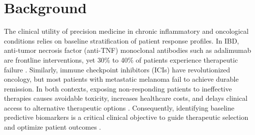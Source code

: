 \documentclass{bmcart}
\begin{document}
\begin{frontmatter}
\begin{abstractbox}
\begin{abstract}
Current public single-cell treatment response cohorts are systematically underpowered. Global preprocessing before cross-validation splits inflates significance, making properly nested permutation architectures mandatory for biomarker validation. The most stable biological signals identified in this study, notably \textit{TNK1}, warrant targeted validation in larger prospective patient cohorts.
\end{abstract}

\begin{keyword}
\end{keyword}

\end{abstractbox}

\end{frontmatter}

\section*{Background}
The clinical utility of precision medicine in chronic inflammatory and oncological conditions relies on baseline stratification of patient response profiles. In IBD, anti-tumor necrosis factor (anti-TNF) monoclonal antibodies such as adalimumab are frontline interventions, yet 30\% to 40\% of patients experience therapeutic failure \cite{roda}. Similarly, immune checkpoint inhibitors (ICIs) have revolutionized oncology, but most patients with metastatic melanoma fail to achieve durable remission. In both contexts, exposing non-responding patients to ineffective therapies causes avoidable toxicity, increases healthcare costs, and delays clinical access to alternative therapeutic options \cite{alatab,roda}. Consequently, identifying baseline predictive biomarkers is a critical clinical objective to guide therapeutic selection and optimize patient outcomes \cite{alatab,riaz,sadefeldman}.
\end{document}
